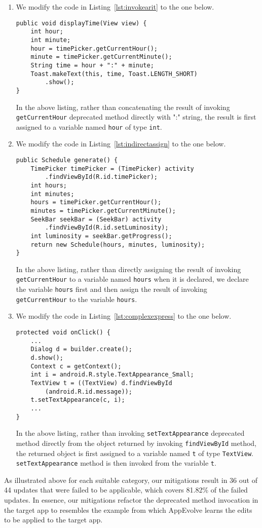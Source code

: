 \begin{enumerate}
\item We modify the code in Listing~\ref{lst:invokearit} to the one below.
\begin{lstlisting}[language=text,numbers=none]
public void displayTime(View view) {
	int hour;
	int minute;
	hour = timePicker.getCurrentHour();
	minute = timePicker.getCurrentMinute();
	String time = hour + ":" + minute;
    Toast.makeText(this, time, Toast.LENGTH_SHORT)
        .show();
}
\end{lstlisting}
In the above listing, rather than concatenating the result of invoking {\tt getCurrentHour} deprecated method directly with ":" string, the result is first assigned to a variable named {\tt hour} of type {\tt int}.

\item We modify the code in Listing~\ref{lst:indirectassign} to the one below.
\begin{lstlisting}[language=text,numbers=none]
public Schedule generate() {
    TimePicker timePicker = (TimePicker) activity
        .findViewById(R.id.timePicker);
    int hours;
    int minutes;
    hours = timePicker.getCurrentHour();
    minutes = timePicker.getCurrentMinute();
    SeekBar seekBar = (SeekBar) activity
        .findViewById(R.id.setLuminosity);
    int luminosity = seekBar.getProgress();
    return new Schedule(hours, minutes, luminosity);
}
\end{lstlisting}
In the above listing, rather than directly assigning the result of invoking {\tt getCurrentHour} to a variable named {\tt hours} when it is declared, we declare the variable {\tt hours} first and then assign the result of invoking {\tt getCurrentHour} to the variable {\tt hours}.

\item We modify the code in Listing~\ref{lst:complexexpress} to the one below.
\begin{lstlisting}[language=text,numbers=none]
protected void onClick() {  
    ...
    Dialog d = builder.create();
    d.show();
    Context c = getContext();
    int i = android.R.style.TextAppearance_Small;
    TextView t = ((TextView) d.findViewById
        (android.R.id.message)); 
    t.setTextAppearance(c, i);
    ...
}
\end{lstlisting}
In the above listing, rather than invoking {\tt setTextAppearance} deprecated method directly from the object returned by invoking {\tt findViewById} method, the returned object is first assigned to a variable named {\tt t} of type {\tt TextView}. {\tt setTextAppearance} method is then invoked from the variable {\tt t}.

\end{enumerate}

As illustrated above for each suitable category, our mitigations result in 36 out of 44 updates that were failed to be applicable, which covers 81.82\% of the failed updates. In essence, our mitigations refactor the deprecated method invocation in the target app to resembles the example from which AppEvolve learns the edits to be applied to the target app. 